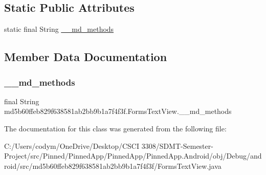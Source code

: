\subsection*{Static Public Attributes}
\begin{DoxyCompactItemize}
\item 
static final String \hyperlink{classmd5b60ffeb829f638581ab2bb9b1a7f4f3f_1_1_forms_text_view_ad4f9b582e68f2509120a1f5414c09541}{\+\_\+\+\_\+md\+\_\+methods}
\end{DoxyCompactItemize}


\subsection{Member Data Documentation}
\mbox{\label{classmd5b60ffeb829f638581ab2bb9b1a7f4f3f_1_1_forms_text_view_ad4f9b582e68f2509120a1f5414c09541}} 
\subsubsection{\texorpdfstring{\+\_\+\+\_\+md\+\_\+methods}{\_\_md\_methods}}
{\footnotesize\ttfamily final String md5b60ffeb829f638581ab2bb9b1a7f4f3f.\+Forms\+Text\+View.\+\_\+\+\_\+md\+\_\+methods\hspace{0.3cm}{\ttfamily [static]}}



The documentation for this class was generated from the following file\+:\begin{DoxyCompactItemize}
\item 
C\+:/\+Users/codym/\+One\+Drive/\+Desktop/\+C\+S\+C\+I 3308/\+S\+D\+M\+T-\/\+Semester-\/\+Project/src/\+Pinned/\+Pinned\+App/\+Pinned\+App/\+Pinned\+App.\+Android/obj/\+Debug/android/src/md5b60ffeb829f638581ab2bb9b1a7f4f3f/Forms\+Text\+View.\+java\end{DoxyCompactItemize}
